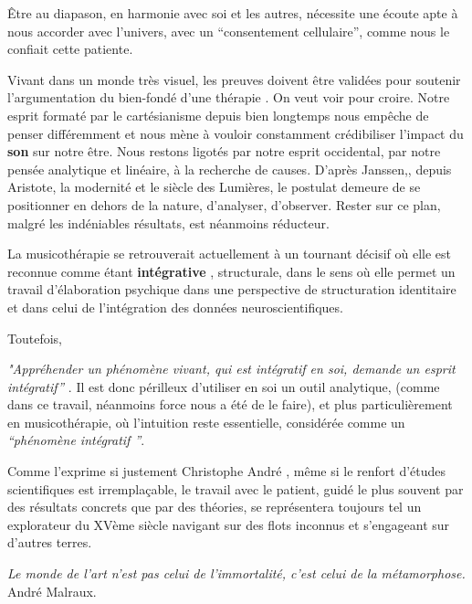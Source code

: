 Être au diapason, en harmonie avec soi et les autres, nécessite une
écoute apte à nous accorder avec l'univers, avec un \enquote {consentement cellulaire}, comme nous le 
confiait cette patiente.

Vivant dans un monde très visuel, les preuves doivent être
validées pour soutenir l'argumentation du bien-fondé d'une thérapie
\autocite[ch. II, pp. 105--106 ]{vrait_musicotherapie_2018}.
      On veut voir pour croire.
Notre esprit formaté par le cartésianisme depuis bien longtemps nous
empêche de penser différemment
et nous mène à vouloir constamment crédibiliser l'impact
du \textbf{son} sur notre être.
Nous restons
  ligotés par notre esprit occidental, par
  notre pensée analytique et linéaire, à la recherche de
  causes.
  D'après Janssen,\autocite[201]{van_eersel_cerveau}, depuis Aristote, la modernité et le
siècle des Lumières, le postulat demeure de se positionner en dehors
de la nature, d'analyser, d'observer.
Rester sur ce plan, malgré les
indéniables résultats, est néanmoins
réducteur.

La musicothérapie  se retrouverait actuellement
 à un tournant décisif où elle est reconnue comme étant
 \textbf{ intégrative} \autocite[ch. III, p. 53,
 105]{vrait_musicotherapie_2018},
struc\-tu\-rale, dans le sens où elle permet un travail d'élaboration psychique dans une perspective de structuration identitaire  et dans celui de l'intégration des données neuroscientifiques.

Toutefois,

\textit{"Appréhender un phénomène vivant, qui est intégratif en soi, demande un esprit
  intégratif''} \autocite[201]{van_eersel_cerveau}.
Il est donc périlleux d'utiliser en soi un outil analytique, (comme dans ce travail, néanmoins force nous a été de le faire), et
plus
particulièrement en musicothérapie, où l'intuition reste essentielle,
considérée comme un \textit{``phénomène intégratif ''}.

Comme l'exprime si justement Christophe André \autocite[154]{van_eersel_cerveau},
même si le renfort d'études
scientifiques est irremplaçable, le travail avec le patient, guidé le plus souvent  par des résultats
concrets que par des théories, se représentera toujours
tel un
explorateur du XVème siècle navigant sur des flots inconnus et
s'engageant sur d'autres terres.


\emph{Le monde de
	l'art n'est pas celui de l'immortalité, c'est celui de la
        métamorphose.}     André Malraux.
    
